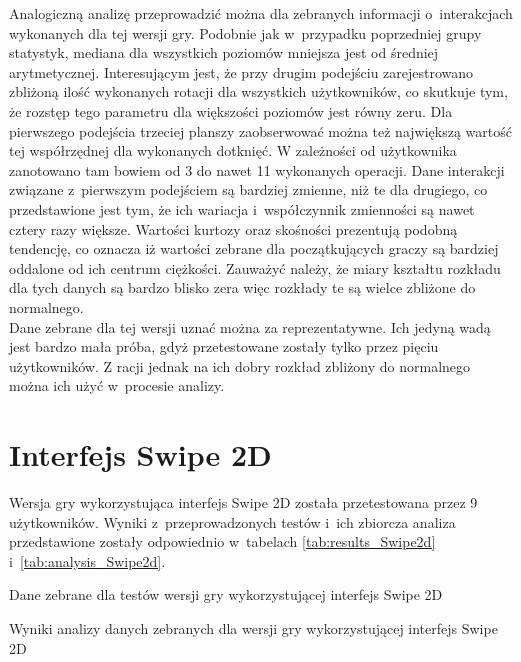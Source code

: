 \documentclass[a4paper,12pt,numbers=noenddot]{report}
\begin{document}
Analogiczną analizę przeprowadzić można dla zebranych informacji o~interakcjach wykonanych dla tej wersji gry. Podobnie jak w~przypadku poprzedniej grupy statystyk, mediana dla wszystkich poziomów mniejsza jest od średniej arytmetycznej. Interesującym jest, że przy drugim podejściu zarejestrowano zbliżoną ilość wykonanych rotacji dla wszystkich użytkowników, co skutkuje tym, że rozstęp tego parametru dla większości poziomów jest równy zeru. Dla pierwszego podejścia trzeciej planszy zaobserwować można też największą wartość tej współrzędnej dla wykonanych dotknięć. W zależności od użytkownika zanotowano tam bowiem od 3 do nawet 11 wykonanych operacji.
Dane interakcji związane z~pierwszym podejściem są bardziej zmienne, niż te dla drugiego, co przedstawione jest tym, że ich wariacja i~współczynnik zmienności są nawet cztery razy większe. Wartości kurtozy oraz skośności prezentują podobną tendencję, co oznacza iż wartości zebrane dla początkujących graczy są bardziej oddalone od ich centrum ciężkości. Zauważyć należy, że miary kształtu rozkładu dla tych danych są bardzo blisko zera więc rozkłady te są wielce zbliżone do normalnego.\\

Dane zebrane dla tej wersji uznać można za reprezentatywne. Ich jedyną wadą jest bardzo mała próba, gdyż przetestowane zostały tylko przez pięciu użytkowników. Z racji jednak na ich dobry rozkład zbliżony do normalnego można ich użyć w~procesie analizy.


\section{Interfejs Swipe 2D}%
Wersja gry wykorzystująca interfejs Swipe 2D została przetestowana przez 9 użytkowników. Wyniki z~przeprowadzonych testów i~ich zbiorcza analiza przedstawione zostały odpowiednio w~tabelach \ref{tab:results_Swipe2d} i~\ref{tab:analysis_Swipe2d}.

\begin{table}
  \caption{Dane zebrane dla testów wersji gry wykorzystującej interfejs Swipe 2D}
  \resizebox{0.9\textwidth}{!}{%
	
  }
  \label{tab:results_Swipe2d}%
  
  
  \caption{Wyniki analizy danych zebranych dla wersji gry wykorzystującej interfejs Swipe 2D}
  \resizebox{0.9\textwidth}{!}{%
	
  }
  \label{tab:analysis_Swipe2d}%
\end{table}%
\end{document}
